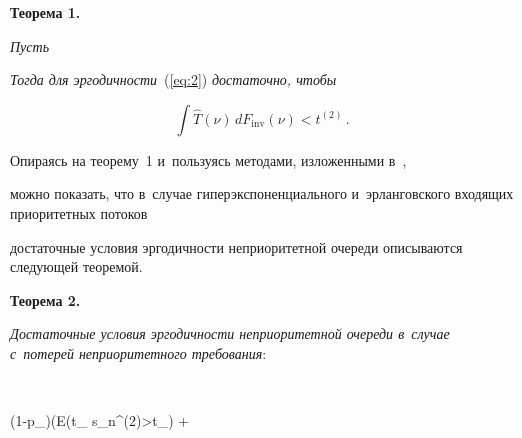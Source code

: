 \smallskip



\noindent

\textbf{Теорема 1.}

\textit{Пусть}




\textit{Тогда для эргодичности}~(\ref{eq:2}) \textit{достаточно, чтобы}

\begin{equation*}

\int\hat{T}(\nu)\,dF_{\mathrm{inv}}(\nu)< t^{(2)}\,.


\end{equation*}





Опираясь на теорему~1 и~пользуясь методами, изложенными в~\cite{1-mis, 5-mis, 6-mis}, 

можно показать, что в~случае гиперэкспоненциального и~эрланговского входящих приоритетных потоков

достаточные условия эргодичности неприоритетной очереди описываются следующей теоремой.



\smallskip



\noindent

\textbf{Теорема 2.}

\textit{Достаточные условия эргодичности неприоритетной очереди в~случае с~потерей неприоритетного требования}:

$$

(1-p_{})\left({\sf E}\left(t_{}\,\vert \,s_{n}^{(2)}>t_{}\right) + 

